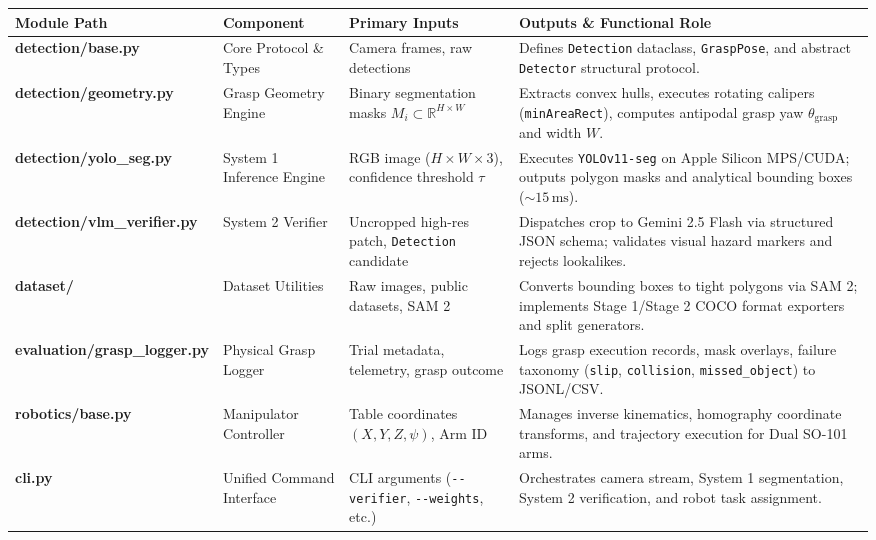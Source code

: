 \documentclass[10pt,a4paper]{article}
\begin{document}
\vspace{0.15em}\noindent%
{\scriptsize\setlength{\tabcolsep}{3.5pt}\renewcommand{\arraystretch}{0.90}%
\begin{tabularx}{\linewidth}{@{} >{\raggedright\arraybackslash\bfseries\ttfamily\tiny}p{2.5cm} >{\raggedright\arraybackslash}p{2.2cm} >{\raggedright\arraybackslash}p{3.1cm} >{\raggedright\arraybackslash}X @{}}
\toprule
\textbf{Module Path} & \textbf{Component} & \textbf{Primary Inputs} & \textbf{Outputs \& Functional Role} \\
\midrule
detection/\newline base.py & Core Protocol \& Types & Camera frames, raw detections & Defines \texttt{Detection} dataclass, \texttt{GraspPose}, and abstract \texttt{Detector} structural protocol. \\
detection/\newline geometry.py & Grasp Geometry Engine & Binary segmentation masks $M_i \subset \mathbb{R}^{H \times W}$ & Extracts convex hulls, executes rotating calipers (\texttt{minAreaRect}), computes antipodal grasp yaw $\theta_{\text{grasp}}$ and width $W$. \\
detection/\newline yolo\_seg.py & System 1 Inference Engine & RGB image ($H \times W \times 3$), confidence threshold $\tau$ & Executes \texttt{YOLOv11-seg} on Apple Silicon MPS/CUDA; outputs polygon masks and analytical bounding boxes (${\sim}15\,\text{ms}$). \\
detection/\newline vlm\_verifier.py & System 2 Verifier & Uncropped high-res patch, \texttt{Detection} candidate & Dispatches crop to Gemini 2.5 Flash via structured JSON schema; validates visual hazard markers and rejects lookalikes. \\
dataset/ & Dataset Utilities & Raw images, public datasets, SAM 2 & Converts bounding boxes to tight polygons via SAM 2; implements Stage 1/Stage 2 COCO format exporters and split generators. \\
evaluation/\newline grasp\_logger.py & Physical Grasp Logger & Trial metadata, telemetry, grasp outcome & Logs grasp execution records, mask overlays, failure taxonomy (\texttt{slip}, \texttt{collision}, \texttt{missed\_object}) to JSONL/CSV. \\
robotics/\newline base.py & Manipulator Controller & Table coordinates $(X, Y, Z, \psi)$, Arm ID & Manages inverse kinematics, homography coordinate transforms, and trajectory execution for Dual SO-101 arms. \\
cli.py & Unified Command Interface & CLI arguments (\texttt{-{}-verifier}, \texttt{-{}-weights}, etc.) & Orchestrates camera stream, System 1 segmentation, System 2 verification, and robot task assignment. \\
\bottomrule
\end{tabularx}
\label{tab:modules}
}
\vspace{0.1em}
\end{document}
